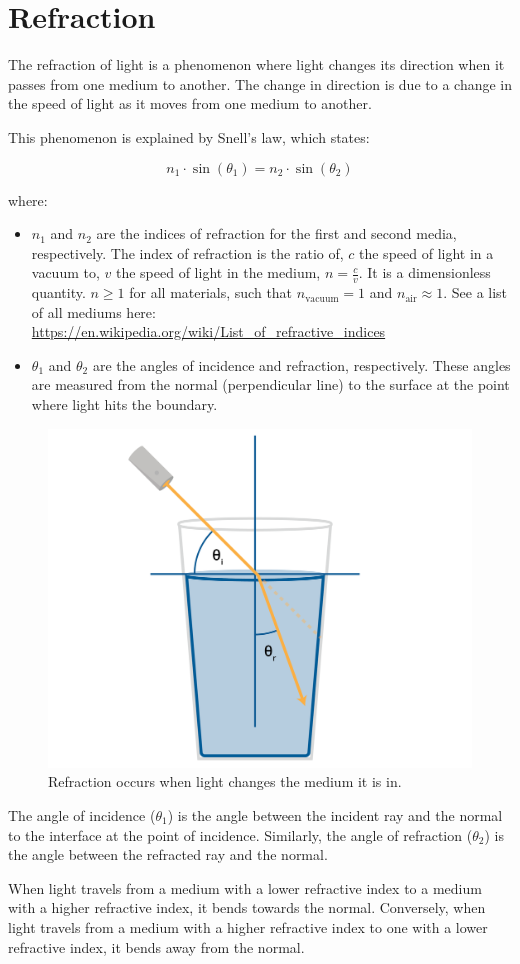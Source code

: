 \chapter{Refraction}


The refraction of light is a phenomenon where light changes its direction when it passes from one medium to another. The change in direction is due to a change in the speed of light as it moves from one medium to another. 

This phenomenon is explained by Snell's law, which states:

\begin{equation}
n_1 \cdot \sin(\theta_1) = n_2 \cdot \sin(\theta_2)
\end{equation}

where:
\begin{itemize}
\item $n_1$ and $n_2$ are the indices of refraction for the first and second media, respectively. The index of refraction is the ratio of, $c$ the speed of light in a vacuum to, $v$ the speed of light in the medium, $n=\frac{c}{v}$. It is a dimensionless quantity. $n \ge 1$ for all materials, such that $n_{\text{vacuum}} = 1$ and $n_{\text{air}} \approx 1$. See a list of all mediums here: \url{https://en.wikipedia.org/wiki/List_of_refractive_indices}
\item $\theta_1$ and $\theta_2$ are the angles of incidence and refraction, respectively. These angles are measured from the normal (perpendicular line) to the surface at the point where light hits the boundary.
\end{itemize}

\begin{figure}[htbp]
    \centering
    \includegraphics[width=.75\textwidth]{refraction.png}
    \caption{Refraction occurs when light changes the medium it is in.}
    \label{fig:refraction}
\end{figure}

The angle of incidence ($\theta_1$) is the angle between the incident ray and the normal to the interface at the point of incidence. Similarly, the angle of refraction ($\theta_2$) is the angle between the refracted ray and the normal.

When light travels from a medium with a lower refractive index to a medium with a higher refractive index, it bends towards the normal. Conversely, when light travels from a medium with a higher refractive index to one with a lower refractive index, it bends away from the normal.

